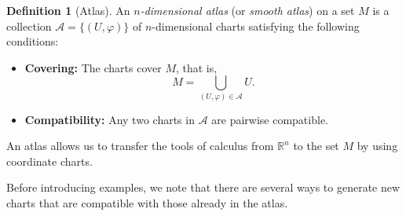 \documentclass[12pt]{article}
\theoremstyle{definition}
\newtheorem{definition}{Definition}[section]
\begin{document}
\medskip
\begin{definition}[Atlas]
An \emph{$n$-dimensional atlas} (or \emph{smooth atlas}) on a set $M$ is a collection $\mathcal{A} = \{(U, \varphi)\}$ of $n$-dimensional charts satisfying the following conditions:

\begin{itemize}
    \item \textbf{Covering:} The charts cover $M$, that is,
    \[
    M = \bigcup_{(U, \varphi) \in \mathcal{A}} U.
    \]
    \item \textbf{Compatibility:} Any two charts in $\mathcal{A}$ are pairwise compatible.
\end{itemize}

An atlas allows us to transfer the tools of calculus from $\mathbb{R}^n$ to the set $M$ by using coordinate charts.

\smallskip
Before introducing examples, we note that there are several ways to generate new charts that are compatible with those already in the atlas.
\end{definition}
\end{document}
